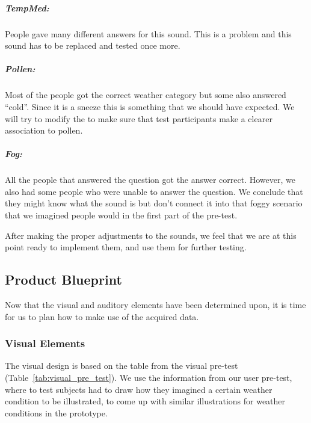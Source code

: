 \subparagraph{TempMed:} %
\label{subp:tempmed_}
People gave many different answers for this sound. 
This is a problem and this sound has to be replaced and tested once more.

\subparagraph{Pollen:} %
\label{subp:pollen_}
Most of the people got the correct weather category but some also answered \enquote{cold}. 
Since it is a sneeze this is something that we should have expected. 
We will try to modify the to make sure that test participants make a clearer association to pollen. 

\subparagraph{Fog:} %
\label{subp:fog_}
All the people that answered the question got the answer correct. 
However, we also had some people who were unable to answer the question. 
We conclude that they might know what the sound is but don’t connect it into that foggy scenario that we imagined people would in the first part of the pre-test.


After making the proper adjustments to the sounds, we feel that we are at this point ready to implement them, and use them for further testing.



\FloatBarrier
\subsection{Product Blueprint} %
\label{sub:product_blueprint}

Now that the visual and auditory elements have been determined upon, it is time for us to plan how to make use of the acquired data.

\subsubsection{Visual Elements} %
\label{ssub:visual_elements}

The visual design is based on the table from the visual pre-test (Table~\ref{tab:visual_pre_test}). We use the information from our user pre-test, where to test subjects had to draw how they imagined a certain weather condition to be illustrated, to come up with similar illustrations for weather conditions in the prototype.



